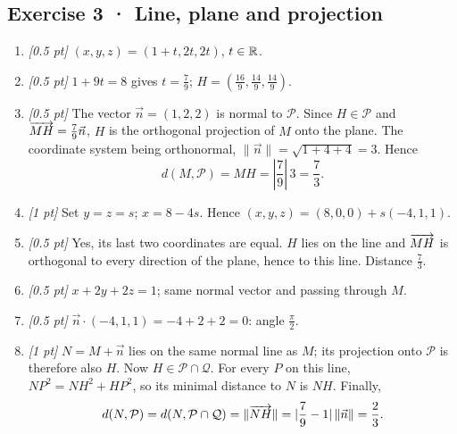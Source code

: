 \subsection*{Exercise 3 · Line, plane and projection}\begin{enumerate}

\item \textit{[0.5 pt]} $(x,y,z)=(1+t,2t,2t)$, $t\in\mathbb R$.

\item \textit{[0.5 pt]} $1+9t=8$ gives $t=\frac{7}{9}$; $H=(\frac{16}{9},\frac{14}{9},\frac{14}{9})$.

\item \textit{[0.5 pt]} The vector $\vec n=(1,2,2)$ is normal to $\mathcal P$. Since $H\in\mathcal P$ and $\overrightarrow{MH}=\frac{7}{9}\vec n$, $H$ is the orthogonal projection of $M$ onto the plane. The coordinate system being orthonormal, $\|\vec n\|=\sqrt{1+4+4}=3$. Hence
\[d(M,\mathcal P)=MH=|\frac{7}{9}|\,3=\frac{7}{3}.\]

\item \textit{[1 pt]} Set $y=z=s$; $x=8-4s$. Hence $(x,y,z)=(8,0,0)+s(-4,1,1)$.

\item \textit{[0.5 pt]} Yes, its last two coordinates are equal. $H$ lies on the line and $\overrightarrow{MH}$ is orthogonal to every direction of the plane, hence to this line. Distance $\frac{7}{3}$.

\item \textit{[0.5 pt]} $x+2y+2z=1$; same normal vector and passing through $M$.

\item \textit{[0.5 pt]} $\vec n\cdot(-4,1,1)=-4+2+2=0$: angle $\frac{\pi}{2}$.

\item \textit{[1 pt]} $N=M+\vec n$ lies on the same normal line as $M$; its projection onto $\mathcal P$ is therefore also $H$. Now $H\in\mathcal P\cap\mathcal Q$. For every $P$ on this line, $NP^2=NH^2+HP^2$, so its minimal distance to $N$ is $NH$. Finally,
\[d(N,\mathcal P)=d(N,\mathcal P\cap\mathcal Q)=\|\overrightarrow{NH}\|=|\frac{7}{9}-1|\,\|\vec n\|=\frac{2}{3}.\]

\end{enumerate}


